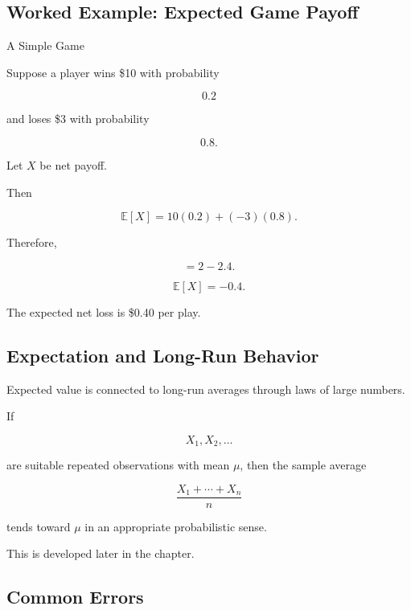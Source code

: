 \subsection{Worked Example: Expected Game Payoff}
\label{subsec:worked-game-payoff}

\begin{workedexamplebox}{A Simple Game}

Suppose a player wins \$10 with probability

\[
0.2
\]

and loses \$3 with probability

\[
0.8.
\]

Let \(X\) be net payoff.

Then

\[
\mathbb{E}[X]
=
10(0.2)
+
(-3)(0.8).
\]

Therefore,

\[
=
2-2.4.
\]

\begin{answerbox}
\[
\boxed{
\mathbb{E}[X]
=
-0.4.
}
\]
\end{answerbox}

The expected net loss is \$0.40 per play.
\end{workedexamplebox}

\subsection{Expectation and Long-Run Behavior}
\label{subsec:expectation-long-run}

Expected value is connected to long-run averages through laws of large
numbers.

If

\[
X_1,X_2,\ldots
\]

are suitable repeated observations with mean \(\mu\), then the sample
average

\[
\frac{
X_1+\cdots+X_n
}{n}
\]

tends toward \(\mu\) in an appropriate probabilistic sense.

This is developed later in the chapter.

\subsection{Common Errors}
\label{subsec:expectation-moments-common-errors}


